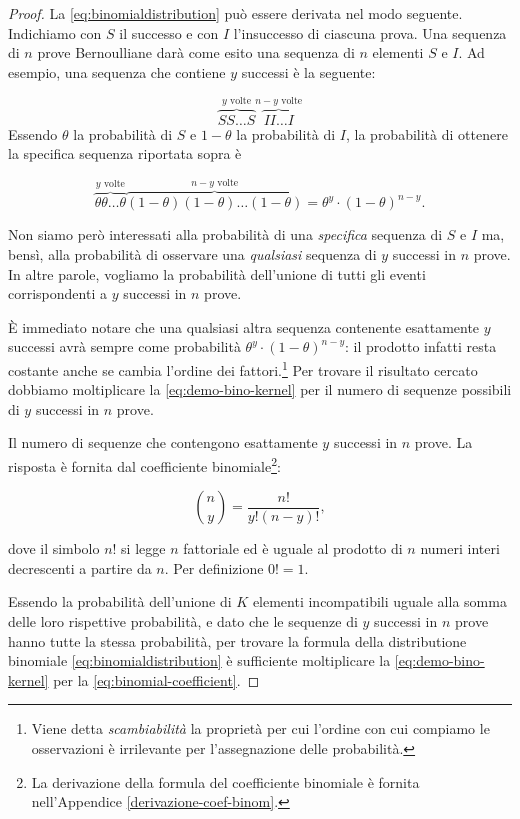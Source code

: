 \documentclass[
  11pt,
]{krantz}
\theoremstyle{definition}
\theoremstyle{definition}
\theoremstyle{definition}
\theoremstyle{definition}
\theoremstyle{remark}
\begin{document}
\begin{proof}
La \eqref{eq:binomialdistribution} può essere derivata nel modo seguente. Indichiamo con \(S\) il successo e con \(I\) l'insuccesso di ciascuna prova. Una sequenza di \(n\) prove Bernoulliane darà come esito una sequenza di \(n\) elementi \(S\) e \(I\). Ad esempio, una sequenza che contiene \(y\) successi è la seguente:

\[
\overbrace{SS\dots S}^\text{$y$ volte} \overbrace{II\dots I}^\text{$n-y$ volte}
\] Essendo \(\theta\) la probabilità di \(S\) e \(1-\theta\) la probabilità di \(I\), la probabilità di ottenere la specifica sequenza riportata sopra è

\begin{equation}
\overbrace{\theta \theta\dots \theta}^\text{$y$ volte} \overbrace{(1-\theta)(1-\theta)\dots (1-\theta)}^\text{$n-y$ volte} = \theta^y \cdot (1-\theta)^{n-y}.
\label{eq:demo-bino-kernel}
\end{equation}

Non siamo però interessati alla probabilità di una \emph{specifica} sequenza di \(S\) e \(I\) ma, bensì, alla probabilità di osservare una \emph{qualsiasi} sequenza di \(y\) successi in \(n\) prove. In altre parole, vogliamo la probabilità dell'unione di tutti gli eventi corrispondenti a \(y\) successi in \(n\) prove.

È immediato notare che una qualsiasi altra sequenza contenente esattamente \(y\) successi avrà sempre come probabilità \(\theta^y \cdot (1-\theta)^{n-y}\): il prodotto infatti resta costante anche se cambia l'ordine dei fattori.\footnote{Viene detta \emph{scambiabilità} la proprietà per cui l'ordine con cui compiamo le osservazioni è irrilevante per l'assegnazione delle probabilità.} Per trovare il risultato cercato dobbiamo moltiplicare la \eqref{eq:demo-bino-kernel} per il numero di sequenze possibili di \(y\) successi in \(n\) prove.

Il numero di sequenze che contengono esattamente \(y\) successi in \(n\) prove. La risposta è fornita dal coefficiente binomiale\footnote{La derivazione della formula del coefficiente binomiale è fornita nell'Appendice \ref{derivazione-coef-binom}.}:

\begin{equation}
\binom{n}{y} = \frac{n!}{y!(n-y)!},
\label{eq:binomial-coefficient}
\end{equation}

dove il simbolo \(n!\) si legge \(n\) fattoriale ed è uguale al prodotto di \(n\) numeri interi decrescenti a partire da \(n\). Per definizione \(0! = 1\).

Essendo la probabilità dell'unione di \(K\) elementi incompatibili uguale alla somma delle loro rispettive probabilità, e dato che le sequenze di \(y\) successi in \(n\) prove hanno tutte la stessa probabilità, per trovare la formula della distributione binomiale \eqref{eq:binomialdistribution} è sufficiente moltiplicare la \eqref{eq:demo-bino-kernel} per la \eqref{eq:binomial-coefficient}.
\end{proof}
\end{document}
